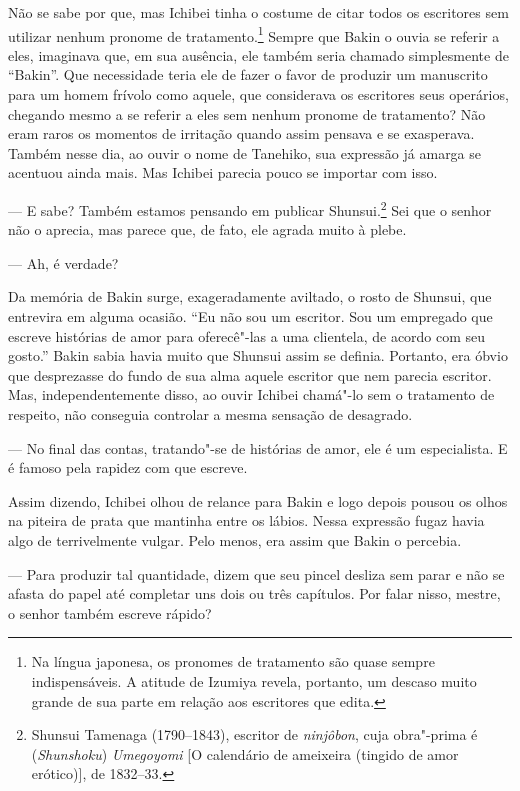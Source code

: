 Não se sabe por que, mas Ichibei tinha o costume de citar todos os
escritores sem utilizar nenhum pronome de tratamento.\footnote{ Na
língua japonesa, os pronomes de tratamento são quase sempre
indispensáveis. A atitude de Izumiya revela, portanto, um descaso muito
grande de sua parte em relação aos escritores que edita. \par } Sempre
que Bakin o ouvia se referir a eles, imaginava que, em sua ausência,
ele também seria chamado simplesmente de ``Bakin''. Que necessidade teria
ele de fazer o favor de produzir um manuscrito para um homem frívolo
como aquele, que considerava os escritores seus operários, chegando
mesmo a se referir a eles sem nenhum pronome de tratamento? Não eram
raros os momentos de irritação quando assim pensava e se exasperava.
Também nesse dia, ao ouvir o nome de Tanehiko, sua expressão já amarga
se acentuou ainda mais. Mas Ichibei parecia pouco se importar com isso.

--- E sabe? Também estamos pensando em publicar Shunsui.\footnote{ Shunsui Tamenaga 
(1790--1843), escritor de \textit{ninjôbon}, cuja obra"-prima é 
(\textit{Shunshoku}) \textit{Umegoyomi} [O calendário de ameixeira (tingido de
amor erótico)], de 1832--33.} Sei que o senhor não o aprecia, mas
parece que, de fato, ele agrada muito à plebe.

--- Ah, é verdade?

Da memória de Bakin surge, exageradamente aviltado, o rosto de Shunsui,
que entrevira em alguma ocasião. ``Eu não sou um escritor. Sou um
empregado que escreve histórias de amor para oferecê"-las a uma
clientela, de acordo com seu gosto.'' Bakin sabia havia muito que
Shunsui assim se definia. Portanto, era óbvio que desprezasse do fundo
de sua alma aquele escritor que nem parecia escritor. Mas,
independentemente disso, ao ouvir Ichibei chamá"-lo sem o tratamento de
respeito, não conseguia controlar a mesma sensação de desagrado.

--- No final das contas, tratando"-se de histórias de amor, ele é um
especialista. E é famoso pela rapidez com que escreve.

Assim dizendo, Ichibei olhou de relance para Bakin e logo depois pousou
os olhos na piteira de prata que mantinha entre os lábios. Nessa
expressão fugaz havia algo de terrivelmente vulgar. Pelo menos, era
assim que Bakin o percebia.

--- Para produzir tal quantidade, dizem que seu pincel desliza sem parar e 
não se afasta do papel até completar uns dois ou três capítulos. Por
falar nisso, mestre, o senhor também escreve rápido?


